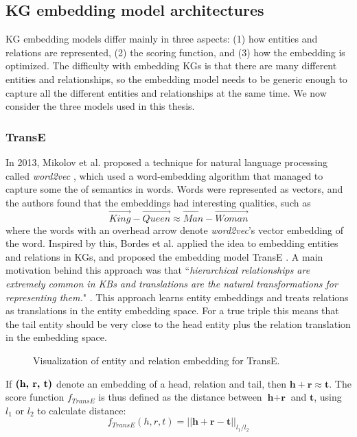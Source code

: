 \subsection{KG embedding model architectures}
\label{KG_embeddings_section}
KG embedding models differ mainly in three aspects: (1) how entities and relations are represented, (2) the scoring function, and (3) how the embedding is optimized. The difficulty with embedding KGs is that there are many different entities and relationships, so the embedding model needs to be generic enough to capture all the different entities and relationships at the same time. We now consider the three models used in this thesis.

\subsubsection{TransE}
\label{TransE_peaked_in_2013}
In 2013, Mikolov et al. proposed a technique for natural language processing called \textit{word2vec} \cite{mikolov2013distributed,mikolov2013efficient}, which used a word-embedding algorithm that managed to capture some the of semantics in words. Words were represented as vectors, and the authors found that the embeddings had interesting qualities, such as
\[\overrightarrow{King} - \overrightarrow{Queen} \approx \overrightarrow{Man} -\overrightarrow{Woman}\]
where the words with an overhead arrow denote \textit{word2vec}'s vector embedding of the word. Inspired by this, Bordes et al. applied the idea to embedding entities and relations in KGs, and proposed the embedding model TransE \cite{TransE}. A main motivation behind this approach was that ``\textit{hierarchical relationships are extremely common in KBs and translations are the natural transformations for representing them.}" \cite{TransE}. This approach learns entity embeddings and treats relations as translations in the entity embedding space.  For a true triple this means that the tail entity should be very close to the head entity plus the relation translation in the embedding space. 

\begin{figure}[htp]
    \centering
    
    \caption[TransE embedding.]{Visualization of entity and relation embedding for TransE.}
    \label{IKEA_TransE}
\end{figure}

If $\text{\textbf{(h, r, t)}}$ denote an embedding of a head, relation and tail, then $\textbf{h} + \textbf{r} \approx \textbf{t}$. The score function $f_{TransE}$ is thus defined as the distance between $\textbf{h} + \textbf{r}$ and $\textbf{t}$, using $l_1$ or $l_2$ to calculate distance:
\[f_{TransE}(h, r, t) = ||\textbf{h} + \textbf{r} - \textbf{t}||_{l_1/l_2}\]

